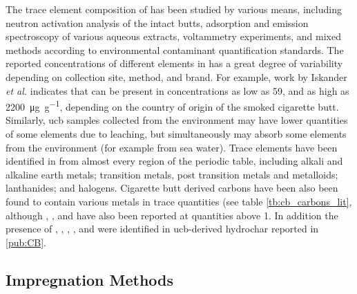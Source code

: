 The trace element composition of  has been studied by various means, including neutron activation analysis of the intact butts,\citep{iskander1992multielement, Iskander1985, jenkins1985neutron, Wu1997} \gls{adsorption} and emission spectroscopy of various aqueous extracts,\citep{MussaloRauhamaa1986, Kazi2009, Moriwaki2009, Moerman2011, Pelit2013, Dobaradaran2018} voltammetry experiments,\citep{Nitsch1991, Kalcher1993} and mixed methods according to environmental contaminant quantification standards.\citep{cardoso2018exposure} The reported concentrations of different elements in  has a great degree of variability depending on collection site, method, and brand. For example, work by Iskander \textit{et al.} indicates that  can be present in concentrations as low as \num{59}, and as high as \qty{2200}{\micro\gram\per\gram}, depending on the country of origin of the smoked cigarette butt. Similarly, \acrshort{ucb} samples collected from the environment\citep{Dobaradaran2017, Moriwaki2009, Moerman2011, chevalier2018nano} may have lower quantities of some elements due to leaching, but simultaneously may absorb some elements from the environment (for example from sea water). Trace elements have been identified in  from almost every region of the periodic table, including alkali and alkaline earth metals;\cite{MussaloRauhamaa1986, Iskander1985, iskander1992multielement, jenkins1985neutron, Wu1997, cardoso2018exposure}  transition metals, post transition metals and metalloids;\citep{MussaloRauhamaa1986, Dobaradaran2017, Iskander1985, jenkins1985neutron, Wu1997, Moriwaki2009, Moerman2011, Pelit2013, Dobaradaran2018, Ren2017, cardoso2018exposure, chevalier2018nano} lanthanides;\citep{iskander1992multielement} and halogens.\citep{Iskander1985, iskander1992multielement, jenkins1985neutron, Wu1997} Cigarette butt derived carbons have been also been found to contain various metals in trace quantities (see table \ref{tb:cb_carbons_lit},\citep{Soltani, Soltani2013, Yazdi2012} although , , and  have also been reported at quantities above \qty{1}{\wtpercent}.\citep{Soltani, Soltani2013, Yazdi2012, lima2018, Lee2014} In addition the presence of , , , , and  were identified in \acrshort{ucb}-derived \gls{hydrochar} reported in \ref{pub:CB}.

\subsection{Impregnation Methods}\label{ss:impregnation}


